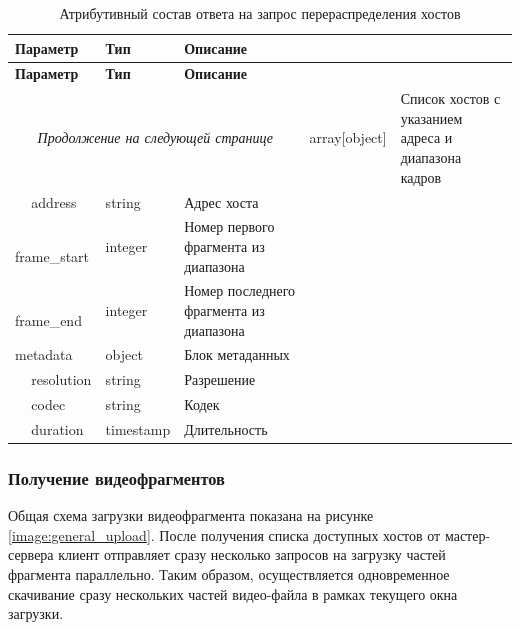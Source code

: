 \begin{longtable}{|p{4cm}|p{3cm}|p{8.5cm}|}
	\caption{Атрибутивный состав ответа на запрос перераспределения хостов}\label{tbl:complaint_response}\\
	\hline
	
	\textbf{Параметр} & \textbf{Тип} & \textbf{Описание}\\ 
	\hline
	\endfirsthead
	
	\hline
	\textbf{Параметр} & \textbf{Тип} & \textbf{Описание}\\ 
	\hline
	\endhead
	
	\hline
	\multicolumn{3}{c}{\textit{Продолжение на следующей странице}}
	\endfoot
	\hline
	\endlastfoot
	
	hosts & 
	array[object] & 
	Список хостов с указанием адреса и диапазона кадров \\
	
	\hline
	\,\,\,\,\,\,\,address & 
	string & 
	Адрес хоста \\
	
	\hline
	\,\,\,\,\,\,\,frame\_start & 
	integer & 
	Номер первого фрагмента из диапазона \\
	
	\hline
	\,\,\,\,\,\,\,frame\_end & 
	integer & 
	Номер последнего фрагмента из диапазона \\
	
	\hline
	metadata & 
	object & 
	Блок метаданных \\
	
	\hline
	\,\,\,\,\,\,\,resolution & 
	string & 
	Разрешение \\
	
	\hline
	\,\,\,\,\,\,\,codec & 
	string & 
	Кодек \\
	
	\hline
	\,\,\,\,\,\,\,duration & 
	timestamp & 
	Длительность \\
\end{longtable}

\subsubsection{Получение видеофрагментов}
Общая схема загрузки видеофрагмента показана на рисунке \ref{image:general_upload}. После получения списка доступных хостов от мастер-сервера клиент отправляет сразу несколько запросов на загрузку частей фрагмента параллельно. Таким образом, осуществляется одновременное скачивание сразу нескольких частей видео-файла в рамках текущего окна загрузки. 

